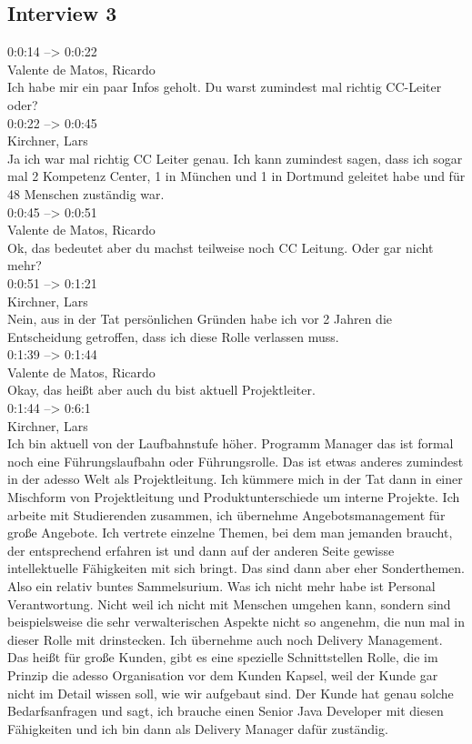 \subsection{Interview 3}
\label{interview3}
0:0:14 --> 0:0:22\\
Valente de Matos, Ricardo\\
Ich habe mir ein paar Infos geholt. Du warst zumindest mal richtig CC-Leiter oder?\\

0:0:22 --> 0:0:45\\
Kirchner, Lars\\
Ja ich war mal richtig CC Leiter genau. Ich kann zumindest sagen, dass ich sogar mal 2 Kompetenz Center, 1 in München und 1 in Dortmund geleitet habe und für 48 Menschen zuständig war.\\

0:0:45 --> 0:0:51\\
Valente de Matos, Ricardo\\
Ok, das bedeutet aber du machst teilweise noch CC Leitung. Oder gar nicht mehr?\\

0:0:51 --> 0:1:21\\
Kirchner, Lars\\
Nein, aus in der Tat persönlichen Gründen habe ich vor 2 Jahren die Entscheidung getroffen, dass ich diese Rolle verlassen muss.\\

0:1:39 --> 0:1:44\\
Valente de Matos, Ricardo\\
Okay, das heißt aber auch du bist aktuell Projektleiter.\\

0:1:44 --> 0:6:1\\
Kirchner, Lars\\
Ich bin aktuell von der Laufbahnstufe höher. Programm Manager das ist formal noch eine Führungslaufbahn oder Führungsrolle. Das ist etwas anderes zumindest in der adesso Welt als Projektleitung. Ich kümmere mich in der Tat dann in einer Mischform von Projektleitung und Produktunterschiede um interne Projekte. Ich arbeite mit Studierenden zusammen, ich übernehme Angebotsmanagement für große Angebote. Ich vertrete einzelne Themen, bei dem man jemanden braucht, der entsprechend erfahren ist und dann auf der anderen Seite gewisse intellektuelle Fähigkeiten mit sich bringt. Das sind dann aber eher Sonderthemen. Also ein relativ buntes Sammelsurium. Was ich nicht mehr habe ist Personal Verantwortung. Nicht weil ich nicht mit Menschen umgehen kann, sondern sind beispielsweise die sehr verwalterischen Aspekte nicht so angenehm, die nun mal in dieser Rolle mit drinstecken. Ich übernehme auch noch Delivery Management. Das heißt für große Kunden, gibt es eine spezielle Schnittstellen Rolle, die im Prinzip die adesso Organisation vor dem Kunden Kapsel, weil der Kunde gar nicht im Detail wissen soll, wie wir aufgebaut sind. Der Kunde hat genau solche Bedarfsanfragen und sagt, ich brauche einen Senior Java Developer mit diesen Fähigkeiten und ich bin dann als Delivery Manager dafür zuständig.\\

